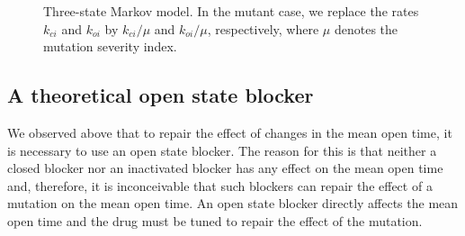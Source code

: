 \begin{figure}[ptb]
\begin{center}
\end{center}
\caption{Three-state Markov model. In the mutant case, we
replace the rates $k_{ci}$ and $k_{oi}$ by  $k_{ci}/\mu$ and $k_{oi}/\mu$, 
respectively, where $\mu$ denotes the mutation severity index.}
\label{MOT_mut_L:ICO}
\end{figure}



\subsection{A theoretical open state blocker}



We observed above that to repair the effect of changes in the mean
open time, it is necessary to use an open state blocker. The reason for this is 
that neither a closed blocker nor an inactivated blocker has any effect on the 
mean open time and, therefore, it is inconceivable that such blockers 
can repair the effect of a mutation on the mean open time. An open state blocker 
directly affects the mean open time and the drug must be tuned to repair the 
effect of the mutation.


